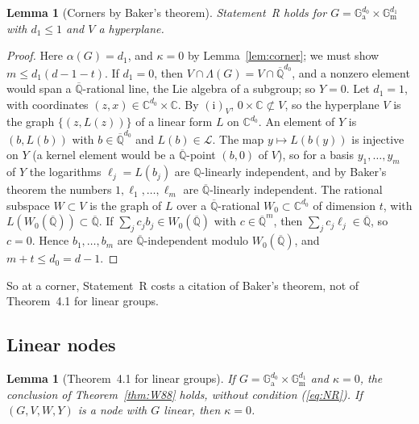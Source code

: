 \documentclass[11pt]{amsart}
\newtheorem{lemma}[theorem]{Lemma}
\theoremstyle{definition}
\newcommand{\Qb}{\overline{\mathbb{Q}}}
\newcommand{\C}{\mathbb{C}}
\newcommand{\Q}{\mathbb{Q}}
\newcommand{\Ga}{\mathbb{G}_{\mathrm a}}
\newcommand{\Gm}{\mathbb{G}_{\mathrm m}}
\newcommand{\Lg}{\mathcal{L}}
\begin{document}
\begin{lemma}[Corners by Baker's theorem]\label{lem:bakercorner}
Statement~R holds for $G=\Ga^{d_0}\times\Gm^{d_1}$ with $d_1\le1$ and $V$ a hyperplane.
\end{lemma}

\begin{proof}
Here $\alpha(G)=d_1$, and $\kappa=0$ by Lemma~\ref{lem:corner}; we must show $m\le d_1(d-1-t)$. If $d_1=0$, then
$V\cap\Lambda(G)=V\cap\Qb^{d_0}$, and a nonzero element would span a $\Qb$-rational line, the Lie algebra of a subgroup; so
$Y=0$. Let $d_1=1$, with coordinates $(z,x)\in\C^{d_0}\times\C$. By $(\mathrm i)_V$, $0\times\C\not\subset V$, so the
hyperplane $V$ is the graph $\{(z,L(z))\}$ of a linear form $L$ on $\C^{d_0}$. An element of $Y$ is $(b,L(b))$ with
$b\in\Qb^{d_0}$ and $L(b)\in\Lg$. The map $y\mapsto L(b(y))$ is injective on $Y$ (a kernel element would be a $\Qb$-point
$(b,0)$ of $V$), so for a basis $y_1,\dots,y_m$ of $Y$ the logarithms $\ell_j=L(b_j)$ are $\Q$-linearly independent, and by
Baker's theorem \cite{Ba66} the numbers $1,\ell_1,\dots,\ell_m$ are $\Qb$-linearly independent. The rational subspace
$W\subset V$ is the graph of $L$ over a $\Qb$-rational $W_0\subset\C^{d_0}$ of dimension $t$, with $L(W_0(\Qb))\subset\Qb$. If
$\sum_jc_jb_j\in W_0(\Qb)$ with $c\in\Qb^m$, then $\sum_jc_j\ell_j\in\Qb$, so $c=0$. Hence $b_1,\dots,b_m$ are
$\Qb$-independent modulo $W_0(\Qb)$, and $m+t\le d_0=d-1$.
\end{proof}

\noindent So at a corner, Statement~R costs a citation of Baker's theorem, not of Theorem~4.1 for linear groups.

\subsection{Linear nodes}\label{sec:linear}

\begin{lemma}[Theorem~4.1 for linear groups]\label{lem:U0}
If $G=\Ga^{d_0}\times\Gm^{d_1}$ and $\kappa=0$, the conclusion of Theorem~\ref{thm:W88} holds, without condition
(\ref{eq:NR}). If $(G,V,W,Y)$ is a node with $G$ linear, then $\kappa=0$.
\end{lemma}
\end{document}
